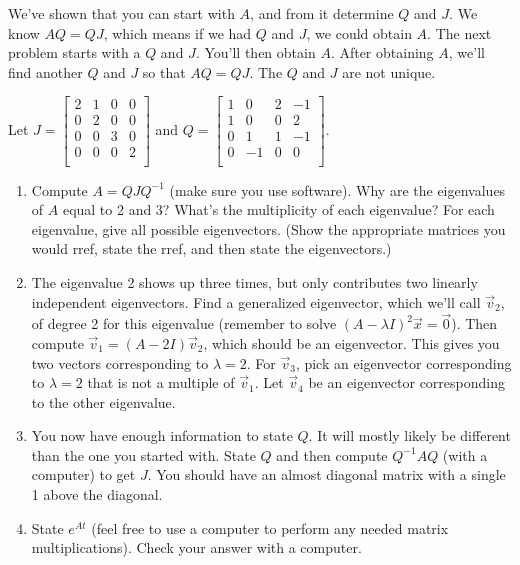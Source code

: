 We've shown that you can start with $A$, and from it determine $Q$ and $J$. We know $AQ = QJ$, which means if we had $Q$ and $J$, we could obtain $A$.  The next problem starts with a $Q$ and $J$. You'll then obtain $A$.  After obtaining $A$, we'll find another $Q$ and $J$ so that $AQ=QJ$.   The $Q$ and $J$ are not unique. 
\begin{problem}
% 
Let 
$J=
\begin{bmatrix}
 2 & 1 & 0 & 0 \\
 0 & 2 & 0 & 0 \\
 0 & 0 & 3 & 0 \\
 0 & 0 & 0 & 2 \\
\end{bmatrix}
$
and
$Q=
\begin{bmatrix}
 1 & 0 & 2 & -1 \\
 1 & 0 & 0 & 2 \\
 0 & 1 & 1 & -1 \\
 0 & -1 & 0 & 0 \\
\end{bmatrix}
$.
\begin{enumerate}
 \item Compute $A = QJQ^{-1}$ (make sure you use software). Why are the eigenvalues of $A$ equal to 2 and 3? What's the multiplicity of each eigenvalue? For each eigenvalue, give all possible eigenvectors. (Show the appropriate matrices you would rref, state the rref, and then state the eigenvectors.)
 \item The eigenvalue 2 shows up three times, but only contributes two linearly independent eigenvectors.  Find a generalized eigenvector, which we'll call $\vec v_2$, of degree 2 for this eigenvalue (remember to solve $(A-\lambda I)^2\vec x=\vec 0$). Then compute $\vec v_1= (A-2 I)\vec v_2$, which should be an eigenvector. This gives you two vectors corresponding to $\lambda = 2$.  For $\vec v_3$, pick an eigenvector corresponding to $\lambda = 2$ that is not a multiple of $\vec v_1$.  Let $\vec v_4$ be an eigenvector corresponding to the other eigenvalue. 
 \item You now have enough information to state $Q$. It will mostly likely be different than the one you started with.  State $Q$ and then compute $Q^{-1}AQ$ (with a computer) to get $J$.  You should have an almost diagonal matrix with a single 1 above the diagonal. 
 \item State $e^{At}$ (feel free to use a computer to perform any needed matrix multiplications). Check your answer with a computer. 
\end{enumerate}
\end{problem}




